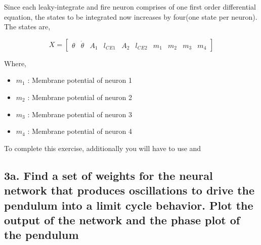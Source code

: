 \documentclass{cmc}
\begin{document}
Since each leaky-integrate and fire neuron comprises of one first
order differential equation, the states to be integrated now increases
by four(one state per neuron). The states are,


\begin{equation}
  \label{eq:1}
  X = \begin{bmatrix}
    \theta & \dot{\theta} & A_1 & l_{CE1} & A_2 & l_{CE2} & m_1 & m_2 & m_3 & m_4
  \end{bmatrix}
\end{equation}

Where,

\begin{itemize}
\item $m_1$ : Membrane potential of neuron 1
\item $m_2$ : Membrane potential of neuron 2
\item $m_3$ : Membrane potential of neuron 3
\item $m_4$ : Membrane potential of neuron 4
\end{itemize}

To complete this exercise, additionally you will have to use
 and 

\subsection*{3a. Find a set of weights for the neural network that
  produces oscillations to drive the pendulum into a limit cycle
  behavior. Plot the output of the network and the phase plot of
the pendulum}
\label{sec:4a}
\end{document}
